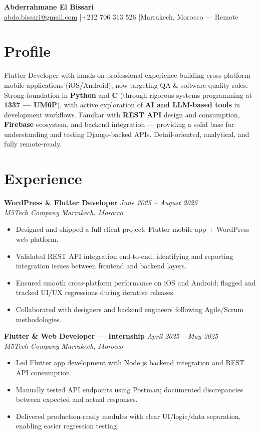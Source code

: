 \documentclass[10pt, a4paper]{article}
\newcommand{\cvheader}[4]{%
  \begin{center}
    {\Huge\bfseries\color{black} #1}\\[4pt]
    {\small\color{medgray} #2 \quad|\quad #3 \quad|\quad #4}
  \end{center}
}
\newcommand{\entry}[4]{%
  \textbf{\color{black}#1} \hfill \textit{\small\color{medgray}#2}\\
  \textit{\small\color{darkgray}#3} \hfill \textit{\small\color{lightgray}#4}\\
}
\begin{document}
\cvheader{Abderrahmane El Bissari}%
  {\href{mailto:abdo.bissari@gmail.com}{abdo.bissari@gmail.com}}%
  {+212 706 313 526}%
  {Marrakech, Morocco — Remote}

\vspace{6pt}

\section{Profile}

Flutter Developer with hands-on professional experience building cross-platform 
mobile applications (iOS/Android), now targeting QA \& software quality roles. 
Strong foundation in \textbf{Python} and \textbf{C} (through rigorous systems 
programming at \textbf{1337 — UM6P}), with active exploration of \textbf{AI and 
LLM-based tools} in development workflows. Familiar with \textbf{REST API} 
design and consumption, \textbf{Firebase} ecosystem, and backend integration — 
providing a solid base for understanding and testing Django-backed APIs. 
Detail-oriented, analytical, and fully remote-ready.

\section{Experience}

\entry{WordPress \& Flutter Developer}{June 2025 – August 2025}%
      {M5Tech Company}{Marrakech, Morocco}
\begin{itemize}
  \item Designed and shipped a full client project: Flutter mobile app + WordPress web platform.
  \item Validated REST API integration end-to-end, identifying and reporting integration issues between frontend and backend layers.
  \item Ensured smooth cross-platform performance on iOS and Android; flagged and tracked UI/UX regressions during iterative releases.
  \item Collaborated with designers and backend engineers following Agile/Scrum methodologies.
\end{itemize}

\vspace{6pt}

\entry{Flutter \& Web Developer — Internship}{April 2025 – May 2025}%
      {M5Tech Company}{Marrakech, Morocco}
\begin{itemize}
  \item Led Flutter app development with Node.js backend integration and REST API consumption.
  \item Manually tested API endpoints using Postman; documented discrepancies between expected and actual responses.
  \item Delivered production-ready modules with clear UI/logic/data separation, enabling easier regression testing.
\end{itemize}
\end{document}
